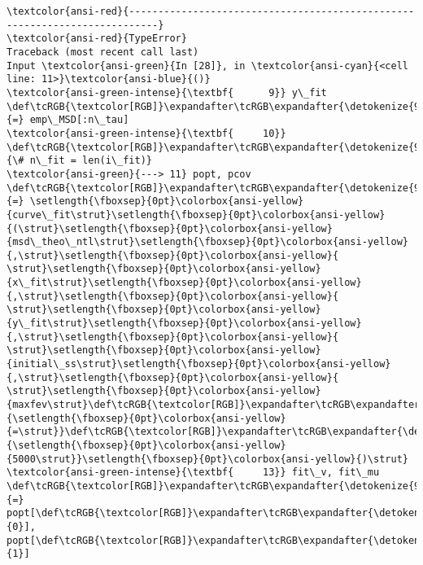 \documentclass[11pt]{article}
\begin{document}
    \begin{Verbatim}[commandchars=\\\{\}, frame=single, framerule=2mm, rulecolor=\color{outerrorbackground}]
\textcolor{ansi-red}{---------------------------------------------------------------------------}
\textcolor{ansi-red}{TypeError}                                 Traceback (most recent call last)
Input \textcolor{ansi-green}{In [28]}, in \textcolor{ansi-cyan}{<cell line: 11>}\textcolor{ansi-blue}{()}
\textcolor{ansi-green-intense}{\textbf{      9}} y\_fit \def\tcRGB{\textcolor[RGB]}\expandafter\tcRGB\expandafter{\detokenize{98,98,98}}{=} emp\_MSD[:n\_tau]
\textcolor{ansi-green-intense}{\textbf{     10}} \def\tcRGB{\textcolor[RGB]}\expandafter\tcRGB\expandafter{\detokenize{95,135,135}}{\# n\_fit = len(i\_fit)}
\textcolor{ansi-green}{---> 11} popt, pcov \def\tcRGB{\textcolor[RGB]}\expandafter\tcRGB\expandafter{\detokenize{98,98,98}}{=} \setlength{\fboxsep}{0pt}\colorbox{ansi-yellow}{curve\_fit\strut}\setlength{\fboxsep}{0pt}\colorbox{ansi-yellow}{(\strut}\setlength{\fboxsep}{0pt}\colorbox{ansi-yellow}{msd\_theo\_ntl\strut}\setlength{\fboxsep}{0pt}\colorbox{ansi-yellow}{,\strut}\setlength{\fboxsep}{0pt}\colorbox{ansi-yellow}{ \strut}\setlength{\fboxsep}{0pt}\colorbox{ansi-yellow}{x\_fit\strut}\setlength{\fboxsep}{0pt}\colorbox{ansi-yellow}{,\strut}\setlength{\fboxsep}{0pt}\colorbox{ansi-yellow}{ \strut}\setlength{\fboxsep}{0pt}\colorbox{ansi-yellow}{y\_fit\strut}\setlength{\fboxsep}{0pt}\colorbox{ansi-yellow}{,\strut}\setlength{\fboxsep}{0pt}\colorbox{ansi-yellow}{ \strut}\setlength{\fboxsep}{0pt}\colorbox{ansi-yellow}{initial\_ss\strut}\setlength{\fboxsep}{0pt}\colorbox{ansi-yellow}{,\strut}\setlength{\fboxsep}{0pt}\colorbox{ansi-yellow}{ \strut}\setlength{\fboxsep}{0pt}\colorbox{ansi-yellow}{maxfev\strut}\def\tcRGB{\textcolor[RGB]}\expandafter\tcRGB\expandafter{\detokenize{98,98,98}}{\setlength{\fboxsep}{0pt}\colorbox{ansi-yellow}{=\strut}}\def\tcRGB{\textcolor[RGB]}\expandafter\tcRGB\expandafter{\detokenize{98,98,98}}{\setlength{\fboxsep}{0pt}\colorbox{ansi-yellow}{5000\strut}}\setlength{\fboxsep}{0pt}\colorbox{ansi-yellow}{)\strut}
\textcolor{ansi-green-intense}{\textbf{     13}} fit\_v, fit\_mu \def\tcRGB{\textcolor[RGB]}\expandafter\tcRGB\expandafter{\detokenize{98,98,98}}{=} popt[\def\tcRGB{\textcolor[RGB]}\expandafter\tcRGB\expandafter{\detokenize{98,98,98}}{0}], popt[\def\tcRGB{\textcolor[RGB]}\expandafter\tcRGB\expandafter{\detokenize{98,98,98}}{1}]

\end{Verbatim}
\end{document}
